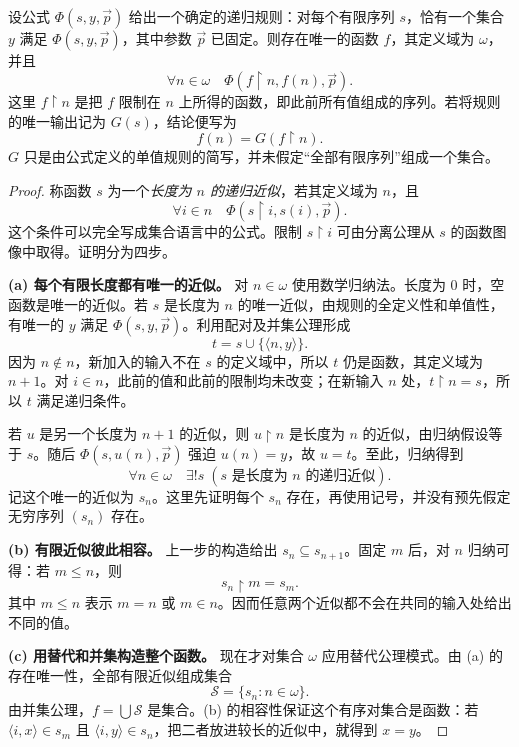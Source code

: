 \documentclass[lang=cn,a4paper,fontset=none,zihao=false,10pt,openany,twoside]{beautybook}
\numberwithin{algorithm}{chapter}
\begin{document}
\begin{theorem}[自然数上的递归定理]\label{thm:zfc-omega-recursion}
设公式 $\Phi(s,y,\vec p)$ 给出一个确定的递归规则：对每个有限序列 $s$，恰有一个集合 $y$ 满足 $\Phi(s,y,\vec p)$，其中参数 $\vec p$ 已固定。则存在唯一的函数 $f$，其定义域为 $\omega$，并且
\[
 \forall n\in\omega\quad
 \Phi(f\mathbin{\upharpoonright}n,f(n),\vec p).
\]
这里 $f\mathbin{\upharpoonright}n$ 是把 $f$ 限制在 $n$ 上所得的函数，即此前所有值组成的序列。若将规则的唯一输出记为 $G(s)$，结论便写为
\[
 f(n)=G(f\mathbin{\upharpoonright}n).
\]
$G$ 只是由公式定义的单值规则的简写，并未假定“全部有限序列”组成一个集合。
\end{theorem}
\begin{proof}
称函数 $s$ 为一个\emph{长度为 $n$ 的递归近似}，若其定义域为 $n$，且
\[
 \forall i\in n\quad
 \Phi(s\mathbin{\upharpoonright}i,s(i),\vec p).
\]
这个条件可以完全写成集合语言中的公式。限制 $s\mathbin{\upharpoonright}i$ 可由分离公理从 $s$ 的函数图像中取得。证明分为四步。

\par\smallskip\noindent\textbf{(a) 每个有限长度都有唯一的近似。}\quad
对 $n\in\omega$ 使用数学归纳法。长度为 $0$ 时，空函数是唯一的近似。若 $s$ 是长度为 $n$ 的唯一近似，由规则的全定义性和单值性，有唯一的 $y$ 满足 $\Phi(s,y,\vec p)$。利用配对及并集公理形成
\[
 t=s\cup\{\langle n,y\rangle\}.
\]
因为 $n\notin n$，新加入的输入不在 $s$ 的定义域中，所以 $t$ 仍是函数，其定义域为 $n+1$。对 $i\in n$，此前的值和此前的限制均未改变；在新输入 $n$ 处，$t\mathbin{\upharpoonright}n=s$，所以 $t$ 满足递归条件。

若 $u$ 是另一个长度为 $n+1$ 的近似，则 $u\mathbin{\upharpoonright}n$ 是长度为 $n$ 的近似，由归纳假设等于 $s$。随后 $\Phi(s,u(n),\vec p)$ 强迫 $u(n)=y$，故 $u=t$。至此，归纳得到
\[
 \forall n\in\omega\quad
 \exists!s\;(s\text{ 是长度为 }n\text{ 的递归近似}).
\]
记这个唯一的近似为 $s_n$。这里先证明每个 $s_n$ 存在，再使用记号，并没有预先假定无穷序列 $(s_n)$ 存在。

\par\smallskip\noindent\textbf{(b) 有限近似彼此相容。}\quad
上一步的构造给出 $s_n\subseteq s_{n+1}$。固定 $m$ 后，对 $n$ 归纳可得：若 $m\le n$，则
\[
 s_n\mathbin{\upharpoonright}m=s_m.
\]
其中 $m\le n$ 表示 $m=n$ 或 $m\in n$。因而任意两个近似都不会在共同的输入处给出不同的值。

\par\smallskip\noindent\textbf{(c) 用替代和并集构造整个函数。}\quad
现在才对集合 $\omega$ 应用替代公理模式。由 (a) 的存在唯一性，全部有限近似组成集合
\[
 \mathcal S=\{s_n:n\in\omega\}.
\]
由并集公理，$f=\bigcup\mathcal S$ 是集合。(b) 的相容性保证这个有序对集合是函数：若 $\langle i,x\rangle\in s_m$ 且 $\langle i,y\rangle\in s_n$，把二者放进较长的近似中，就得到 $x=y$。


\end{proof}
\end{document}
